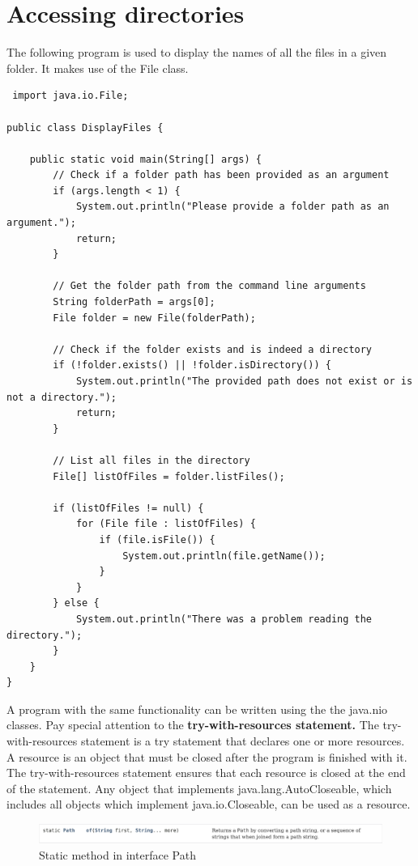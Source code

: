  
 \section{Accessing directories}
 
 The following program is used to display the names of all the files in a given folder.  It makes use of the File class.
 
 \begin{lstlisting}
 import java.io.File;

public class DisplayFiles {

    public static void main(String[] args) {
        // Check if a folder path has been provided as an argument
        if (args.length < 1) {
            System.out.println("Please provide a folder path as an argument.");
            return;
        }

        // Get the folder path from the command line arguments
        String folderPath = args[0];
        File folder = new File(folderPath);

        // Check if the folder exists and is indeed a directory
        if (!folder.exists() || !folder.isDirectory()) {
            System.out.println("The provided path does not exist or is not a directory.");
            return;
        }

        // List all files in the directory
        File[] listOfFiles = folder.listFiles();

        if (listOfFiles != null) {
            for (File file : listOfFiles) {
                if (file.isFile()) {
                    System.out.println(file.getName());
                }
            }
        } else {
            System.out.println("There was a problem reading the directory.");
        }
    }
}
\end{lstlisting}

A program with the same functionality can be written using the the java.nio classes. Pay special attention to the \textbf{try-with-resources statement.} The try-with-resources statement is a try statement that declares one or more resources. A resource is an object that must be closed after the program is finished with it. The try-with-resources statement ensures that each resource is closed at the end of the statement. Any object that implements java.lang.AutoCloseable, which includes all objects which implement java.io.Closeable, can be used as a resource.


\begin{figure}[H]
  \includegraphics[width=\linewidth]{images/h8/path_of.png}
  \caption{Static method in interface Path}
  \label{fig:paths}
\end{figure}


